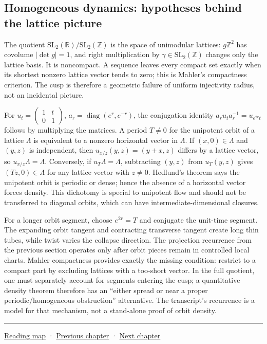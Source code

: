 \subsection{Homogeneous dynamics: hypotheses behind the lattice picture}\label{04-visual-computing-ii-ch033-homogeneous-dynamics-hypotheses-behind-the-lattice-picture}

The quotient \(\mathrm{SL}_2(\mathbb R)/\mathrm{SL}_2(\mathbb Z)\) is the space of unimodular lattices: \(g\mathbb Z^2\) has covolume \(|\det g|=1\), and right multiplication by \(\gamma\in\mathrm{SL}_2(\mathbb Z)\) changes only the lattice basis. It is noncompact. A sequence leaves every compact set exactly when its shortest nonzero lattice vector tends to zero; this is Mahler's compactness criterion. The cusp is therefore a geometric failure of uniform injectivity radius, not an incidental picture.

For \(u_t=\begin{pmatrix}1&t\\0&1\end{pmatrix}\), \(a_r=\operatorname{diag}(e^r,e^{-r})\), the conjugation identity \(a_ru_ta_r^{-1}=u_{e^{2r}t}\) follows by multiplying the matrices. A period \(T\ne0\) for the unipotent orbit of a lattice \(\Lambda\) is equivalent to a nonzero horizontal vector in \(\Lambda\). If \((x,0)\in\Lambda\) and \((y,z)\) is independent, then \(u_{x/z}(y,z)=(y+x,z)\) differs by a lattice vector, so \(u_{x/z}\Lambda=\Lambda\). Conversely, if \(u_T\Lambda=\Lambda\), subtracting \((y,z)\) from \(u_T(y,z)\) gives \((Tz,0)\in\Lambda\) for any lattice vector with \(z\ne0\). Hedlund's theorem says the unipotent orbit is periodic or dense; hence the absence of a horizontal vector forces density. This dichotomy is special to unipotent flow and should not be transferred to diagonal orbits, which can have intermediate-dimensional closures.

For a longer orbit segment, choose \(e^{2r}=T\) and conjugate the unit-time segment. The expanding orbit tangent and contracting transverse tangent create long thin tubes, while twist varies the collapse direction. The projection recurrence from the previous section operates only after orbit pieces remain in controlled local charts. Mahler compactness provides exactly the missing condition: restrict to a compact part by excluding lattices with a too-short vector. In the full quotient, one must separately account for segments entering the cusp; a quantitative density theorem therefore has an ``either spread or near a proper periodic/homogeneous obstruction'' alternative. The transcript's recurrence is a model for that mechanism, not a stand-alone proof of orbit density.

\begin{center}\rule{0.5\linewidth}{0.5pt}\end{center}

\hyperref[volume-reading-map]{Reading map} · \hyperref[04-visual-computing-ii-ch032]{Previous chapter} · \hyperref[04-visual-computing-ii-ch034]{Next chapter}
